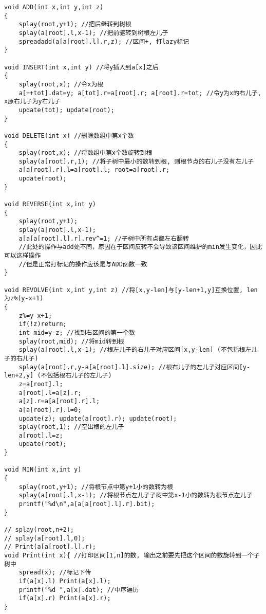 \documentclass[twoside]{article}
\begin{document}
\begin{lstlisting}
void ADD(int x,int y,int z)
{
	splay(root,y+1); //把后继转到树根
	splay(a[root].l,x-1); //把前驱转到树根左儿子
	spreadadd(a[a[root].l].r,z); //区间+, 打lazy标记
}

void INSERT(int x,int y) //将y插入到a[x]之后
{
	splay(root,x); //令x为根
	a[++tot].dat=y; a[tot].r=a[root].r; a[root].r=tot; //令y为x的右儿子, x原右儿子为y右儿子
	update(tot); update(root);
}

void DELETE(int x) //删除数组中第x个数
{
	splay(root,x); //将数组中第x个数旋转到根
	splay(a[root].r,1); //将子树中最小的数转到根, 则根节点的右儿子没有左儿子
	a[a[root].r].l=a[root].l; root=a[root].r;
	update(root);
}

void REVERSE(int x,int y)
{
	splay(root,y+1);
	splay(a[root].l,x-1);
	a[a[a[root].l].r].rev^=1; //子树中所有点都左右翻转
	//此处的操作与add处不同，原因在于区间反转不会导致该区间维护的min发生变化，因此可以这样操作
	//但是正常打标记的操作应该是与ADD函数一致
}

void REVOLVE(int x,int y,int z) //将[x,y-len]与[y-len+1,y]互换位置, len为z%(y-x+1)
{
	z%=y-x+1;
	if(!z)return;
	int mid=y-z; //找到右区间的第一个数
	splay(root,mid); //将mid转到根
	splay(a[root].l,x-1); //根左儿子的右儿子对应区间[x,y-len] (不包括根左儿子的右儿子)
	splay(a[root].r,y-a[a[root].l].size); //根右儿子的左儿子对应区间[y-len+2,y] (不包括根右儿子的左儿子)
	z=a[root].l;
	a[root].l=a[z].r;
	a[z].r=a[a[root].r].l;
	a[a[root].r].l=0;
	update(z); update(a[root].r); update(root);
	splay(root,1); //空出根的左儿子
	a[root].l=z;
	update(root);
}

void MIN(int x,int y)
{
	splay(root,y+1); //将根节点中第y+1小的数转为根
	splay(a[root].l,x-1); //将根节点左儿子子树中第x-1小的数转为根节点左儿子
	printf("%d\n",a[a[a[root].l].r].bit);
}

// splay(root,n+2);
// splay(a[root].l,0);
// Print(a[a[root].l].r);
void Print(int x){ //打印区间[1,n]的数, 输出之前要先把这个区间的数旋转到一个子树中
	spread(x); //标记下传
	if(a[x].l) Print(a[x].l);
	printf("%d ",a[x].dat); //中序遍历
	if(a[x].r) Print(a[x].r);
}


\end{lstlisting}
\end{document}
